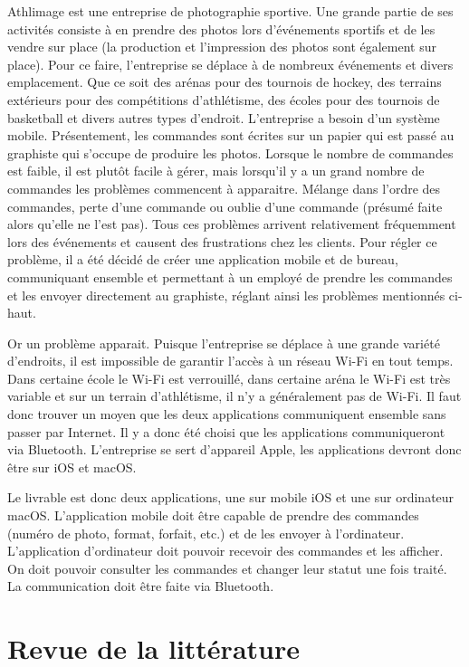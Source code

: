 \documentclass[12pt,fleqn]{article}
\begin{document}
Athlimage est une entreprise de photographie sportive. Une grande partie de ses activités consiste à en prendre des photos lors d’événements sportifs et de les vendre sur place (la production et l’impression des photos sont également sur place). Pour ce faire, l’entreprise se déplace à de nombreux événements et divers emplacement. Que ce soit des arénas pour des tournois de hockey, des terrains extérieurs pour des compétitions d’athlétisme, des écoles pour des tournois de basketball et divers autres types d’endroit. L’entreprise a besoin d’un système mobile. Présentement, les commandes sont écrites sur un papier qui est passé au graphiste qui s’occupe de produire les photos. Lorsque le nombre de commandes est faible, il est plutôt facile à gérer, mais lorsqu’il y a un grand nombre de commandes les problèmes commencent à apparaitre. Mélange dans l’ordre des commandes, perte d’une commande ou oublie d’une commande (présumé faite alors qu’elle ne l’est pas). Tous ces problèmes arrivent relativement fréquemment lors des événements et causent des frustrations chez les clients. Pour régler ce problème, il a été décidé de créer une application mobile et de bureau, communiquant ensemble et permettant à un employé de prendre les commandes et les envoyer directement au graphiste, réglant ainsi les problèmes mentionnés ci-haut.


Or un problème apparait. Puisque l’entreprise se déplace à une grande variété d’endroits, il est impossible de garantir l’accès à un réseau Wi-Fi en tout temps. Dans certaine école le Wi-Fi est verrouillé, dans certaine aréna le Wi-Fi est très variable et sur un terrain d’athlétisme, il n’y a généralement pas de Wi-Fi. Il faut donc trouver un moyen que les deux applications communiquent ensemble sans passer par Internet. Il y a donc été choisi que les applications communiqueront via Bluetooth. L’entreprise se sert d’appareil Apple, les applications devront donc être sur iOS et macOS.


Le livrable est donc deux applications, une sur mobile iOS et une sur ordinateur macOS. L’application mobile doit être capable de prendre des commandes (numéro de photo, format, forfait, etc.) et de les envoyer à l’ordinateur. L’application d’ordinateur doit pouvoir recevoir des commandes et les afficher. On doit pouvoir consulter les commandes et changer leur statut une fois traité. La communication doit être faite via Bluetooth.
\newpage


\section{Revue de la littérature}
\end{document}
